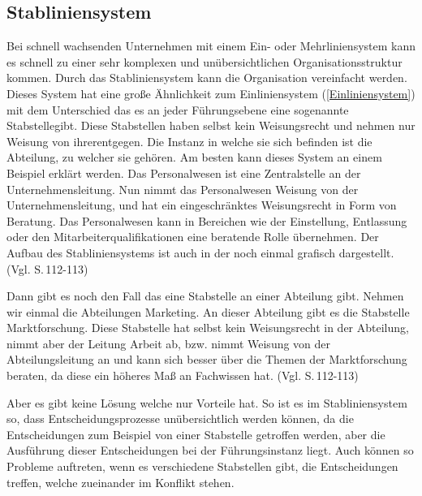     \subsection{Stabliniensystem}   \label{Stablinienorganisation}
        Bei schnell wachsenden Unternehmen mit einem Ein- oder Mehrliniensystem kann es schnell zu einer sehr komplexen 
        und unübersichtlichen Organisationsstruktur kommen. Durch das Stabliniensystem kann die Organisation vereinfacht
        werden. Dieses System hat eine große Ähnlichkeit zum Einliniensystem (\ref{Einliniensystem}) mit dem Unterschied
        das es an jeder Führungsebene eine sogenannte \as Stabstelle\adl gibt. Diese Stabstellen haben selbst kein 
        Weisungsrecht und nehmen nur Weisung von \as ihrer\adl entgegen. Die Instanz in welche sie sich befinden ist 
        die Abteilung, zu welcher sie gehören. Am besten kann dieses System an einem Beispiel erklärt werden. Das 
        Personalwesen ist eine Zentralstelle an der Unternehmensleitung. Nun nimmt das Personalwesen Weisung von der 
        Unternehmensleitung, und hat ein eingeschränktes Weisungsrecht in Form von Beratung. Das Personalwesen kann in 
        Bereichen wie der Einstellung, Entlassung oder den Mitarbeiterqualifikationen eine beratende Rolle übernehmen.
        Der Aufbau des Stabliniensystems  ist auch in der  noch einmal grafisch dargestellt.
        (Vgl. \cite{Woehe2020} S.\,112-113)

        Dann gibt es noch den Fall das eine Stabstelle an einer Abteilung gibt. Nehmen wir einmal die Abteilungen 
        Marketing. An dieser Abteilung gibt es die Stabstelle \as Marktforschung\ad. Diese Stabstelle hat selbst kein
        Weisungsrecht in der Abteilung, nimmt aber der Leitung Arbeit ab, bzw. nimmt Weisung von der Abteilungsleitung 
        an und kann sich besser über die Themen der Marktforschung beraten, da diese ein höheres Maß an Fachwissen hat.
        (Vgl. \cite{Woehe2020} S.\,112-113)
        
        Aber es gibt keine Lösung welche nur Vorteile hat. So ist es im Stabliniensystem so, dass Entscheidungsprozesse 
        unübersichtlich werden können, da die Entscheidungen zum Beispiel von einer Stabstelle getroffen werden, aber
        die Ausführung dieser Entscheidungen bei der Führungsinstanz liegt. Auch können so Probleme auftreten, wenn es
        verschiedene Stabstellen gibt, die Entscheidungen treffen, welche zueinander im Konflikt stehen.

